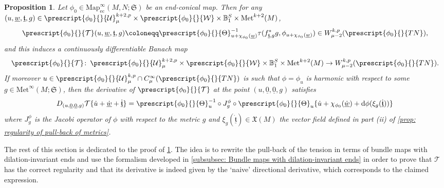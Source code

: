 \documentclass{article}
\numberwithin{equation}{section}        %
\theoremstyle{bfnote}
\newtheorem{prop}[thm]{Proposition}         %
\theoremstyle{definition}
\theoremstyle{bfremark}
\newcommand{\col}{\colon \thinspace}        %
\newcommand{\Ball}{\mathbb{B}}              %
\newcommand{\Map}{\mathrm{Map}}             %
\newcommand{\Met}{\mathrm{Met}}             %
\newcommand{\diff}{\mathrm{d}}                      %
\begin{document}
\begin{prop}        \label{prop: variations of the tension}
    Let $\phi_0 \in \Map^\infty_{\mathrm{ec}}(M,N;\mathfrak{S})$ be an end-conical map. Then for any $(u,\underline{w},\underline{\mathfrak{t}},g) \in \prescript{\phi_0}{}{\mathcal{U}}^{k+2,p}_\mu \times \prescript{\phi_0}{}{\mathcal{W}} \times \Ball_1^S \times \Met^{k+2}(M)$,
    \begin{equation*}
        \prescript{\phi_0}{}{\mathcal{T}}(u,\underline{w},\underline{\mathfrak{t}},g)  \coloneqq \prescript{\phi_0}{}{\Theta}_{u+\chi_{\phi_0}(\underline{w})}^{-1} \tau(f_{\underline{\mathfrak{t}},g}^* g, \phi_{u+\chi_{\phi_0}(\underline{w})}) \in W^{k,p}_{\mu-2}(\prescript{\phi_0}{}{TN}) ,
    \end{equation*}
    and this induces a continuously differentiable Banach map
    \begin{equation*}
        \prescript{\phi_0}{}{\mathcal{T}} \col \prescript{\phi_0}{}{\mathcal{U}}^{k+2,p}_\mu \times \prescript{\phi_0}{}{\mathcal{W}} \times \Ball_1^S \times \Met^{k+2}(M) \to W^{k,p}_{\mu-2}(\prescript{\phi_0}{}{TN}) .
    \end{equation*}
    If moreover $u \in \prescript{\phi_0}{}{\mathcal{U}}^{k,p}_\mu \cap C^\infty_\mu(\prescript{\phi_0}{}{TN})$ is such that $\phi = \phi_{u}$ is harmonic with respect to some $g \in \Met^\infty(M;\mathfrak{S})$, then the derivative of $\prescript{\phi_0}{}{\mathcal{T}}$ at the point $(u,\underline{0},\underline{0},g)$ satisfies
    \begin{equation*}
        D_{(u,\underline{0},\underline{0},g)} \mathcal{T}\{\dot u+ \dot{\underline{w}} +\dot{\underline{\mathfrak{t}}}\} = \prescript{\phi_0}{}{\Theta}_{u}^{-1} \circ  J^{\phi}_g \circ \prescript{\phi_0}{}{\Theta}_{u} \{ \dot u+\chi_{\phi_0}(\dot{\underline{w}}) + \diff \phi (\xi_g(\dot{\underline{\mathfrak{t}}}))\}
    \end{equation*}
    where $J^\phi_g$ is the Jacobi operator of $\phi$ with respect to the metric $g$ and $\xi_g(\dot{\underline{\mathfrak{t}}}) \in \mathfrak{X}(M)$ the vector field defined in part (ii) of \cref{prop: regularity of pull-back of metrics}.
\end{prop}

The rest of this section is dedicated to the proof of \cref{prop: variations of the tension}. The idea is to rewrite the pull-back of the tension in terms of bundle maps with dilation-invariant ends and use the formalism developed in \cref{subsubsec: Bundle maps with dilation-invariant ends} in order to prove that $\mathcal{T}$ has the correct regularity and that its derivative is indeed given by the `naive' directional derivative, which corresponds to the claimed expression. 
\end{document}
